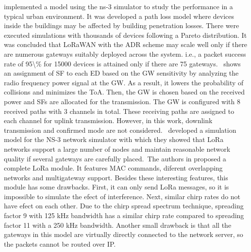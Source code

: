  \cite{magrin_performance_2017}   \citet{magrin_performance_2017} implemented a model using the ns-3 simulator to study the performance in a typical urban environment. It was developed a path loss model where devices inside the buildings may be affected by building penetration losses. There were executed simulations with thousands of devices following a Pareto distribution. It was concluded that LoRaWAN with the ADR scheme may scale well only if there are numerous gateways suitably deployed across the system. i.e., a packet success rate of 95\textbackslash\% for 15000 devices is attained only if there are 75 gateways.~\cite{magrin_performance_2017} shows an assignment of SF to each ED based on the GW sensitivity by analyzing the radio frequency power signal at the GW. As a result, it lowers the probability of collisions and minimizes the ToA. Then, the GW is chosen based on the received power and SFs are allocated for the transmission. The GW is configured with 8 received paths with 3 channels in total. These receiving paths are assigned to each channel for uplink transmission. However, in this work, downlink transmission and confirmed mode are not considered.~\citet{magrin_performance_2017} developed a simulation model for the NS-3 network simulator with which they showed that LoRa networks support a large number of nodes and maintain reasonable network quality if several gateways are carefully placed.~The authors in \cite{magrin_performance_2017} proposed a complete LoRa module. It features MAC commands, diferent overlapping networks and multigateway support. Besides these interesting features, this module has some drawbacks. First, it can only send LoRa messages, so it is impossible to simulate the efect of interference. Next, similar chirp rates do not have efect on each other. Due to the chirp spread spectrum technique, spreading factor 9 with 125 kHz bandwidth has a similar chirp rate compared to spreading factor 11 with a 250 kHz bandwidth. Another small drawback is that all the gateways in this model are virtually directly connected to the network server, so the packets cannot be routed over IP.~   \newline 
